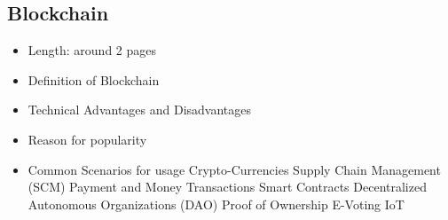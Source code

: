 \subsection{Blockchain}

\begin{itemize}
  \item Length: around 2 pages
  \item Definition of Blockchain
  \item Technical Advantages and Disadvantages
  \item Reason for popularity
  \item Common Scenarios for usage
  \subitem Crypto-Currencies
  \subitem Supply Chain Management (SCM)
  \subitem Payment and Money Transactions
  \subitem Smart Contracts 
  \subitem Decentralized Autonomous Organizations (DAO)
  \subitem Proof of Ownership
  \subitem E-Voting
   \subitem IoT

\end{itemize}
